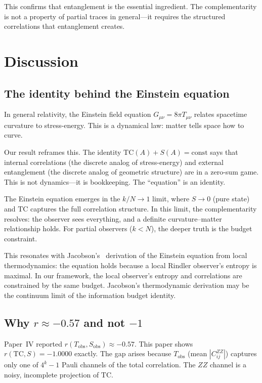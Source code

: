 \documentclass[aps,pra,twocolumn,superscriptaddress,floatfix]{revtex4-2}
\begin{document}
This confirms that entanglement is the essential
ingredient.  The complementarity is not a property
of partial traces in general---it requires the
structured correlations that entanglement creates.


\section{Discussion}
\label{sec:discussion}

\subsection{The identity behind the Einstein equation}

In general relativity, the Einstein field equation
$G_{\mu\nu} = 8\pi T_{\mu\nu}$ relates spacetime
curvature to stress-energy.  This is a dynamical law:
matter tells space how to curve.

Our result reframes this.  The identity
$\mathrm{TC}(A) + S(A) = \mathrm{const}$ says that
internal correlations (the discrete analog of
stress-energy) and external entanglement (the
discrete analog of geometric structure) are in a
zero-sum game.  This is not dynamics---it is
bookkeeping.  The ``equation'' is an identity.

The Einstein equation emerges in the $k/N \to 1$
limit, where $S \to 0$ (pure state) and $\mathrm{TC}$
captures the full correlation structure.  In this limit,
the complementarity resolves: the observer sees everything,
and a definite curvature--matter relationship holds.
For partial observers ($k < N$), the deeper truth is
the budget constraint.

This resonates with Jacobson's~\cite{jacobson1995}
derivation of the Einstein equation from local
thermodynamics: the equation holds because a local
Rindler observer's entropy is maximal.  In our
framework, the local observer's entropy and
correlations are constrained by the same budget.
Jacobson's thermodynamic derivation may be the
continuum limit of the information budget identity.

\subsection{Why $r \approx -0.57$ and not $-1$}

Paper~IV reported $r(T_\mathrm{obs}, S_\mathrm{obs}) \approx -0.57$.
This paper shows $r(\mathrm{TC}, S) = -1.0000$ exactly.
The gap arises because $T_\mathrm{obs}$ (mean $|C_{ij}^{ZZ}|$)
captures only one of $4^k - 1$ Pauli channels of the
total correlation.  The $ZZ$ channel is a noisy,
incomplete projection of $\mathrm{TC}$.
\end{document}
